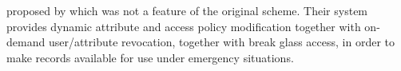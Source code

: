 proposed by \cite{Yu2010a} which was not a feature of the original scheme. Their system provides dynamic attribute and access policy modification together with on-demand user/attribute revocation, together with break glass access, in order to make records available for use under emergency situations.


%
%	
%	
%	
%	
%	

